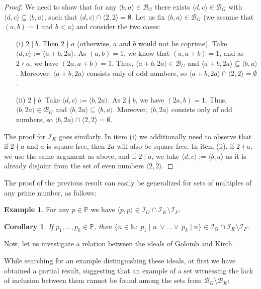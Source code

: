 \documentclass{amsart}
\newtheorem{cor}[thm]{Corollary}
\theoremstyle{definition}
\newtheorem{ex}[thm]{Example}
\newcommand{\N}{{\mathbb N}}
\newcommand{\I}{\mathcal I}
\newcommand{\B}{\mathcal{B}}
\newcommand{\arithseq}[2]{\langle#2, #1\rangle}
\begin{document}
\begin{proof}
We need to show that for any $\arithseq{a}{b} \in \B_G$ there exists $\arithseq{c}{d} \in \B_G$ with $\arithseq{c}{d} \subseteq \arithseq{a}{b}$, such that $\arithseq{c}{d} \cap \arithseq{2}{2} = \emptyset$. Let us fix $\arithseq{a}{b} \in \B_G$ (we assume that $(a,b)=1$ and $b<a$) and consider the two cases:
\begin{itemize}
 \item[(i)] $2\mid b$. Then $2 \nmid a$ (otherwise, $a$ and $b$ would not be coprime). Take $\arithseq{c}{d} := \arithseq{2a}{a+b}$. As $(a,b)=1$, we know that $(a,a+b)=1$, and as $2 \nmid a$, we have $(2a,a+b)=1$. Thus, $\arithseq{2a}{a+b}\in\B_G$ and $\arithseq{2a}{a+b}\subseteq\arithseq{a}{b}$. Moreover, $\arithseq{2a}{a+b}$ consists only of odd numbers, so $\arithseq{2a}{a+b}\cap \arithseq{2}{2} = \emptyset$.
 \item[(ii)] $2\nmid b$. Take $\arithseq{c}{d} := \arithseq{2a}{b}$. As $2\nmid b$, we have $(2a,b)=1$. Thus, $\arithseq{2a}{b}\in\B_G$ and $\arithseq{2a}{b}\subseteq\arithseq{a}{b}$. Moreover, $\arithseq{2a}{b}$ consists only of odd numbers, so $\arithseq{2a}{b}\cap \arithseq{2}{2} = \emptyset$.
\end{itemize}

The proof for $\I_K$ goes similarly. In item (i) we additionally need to observe that if $2 \nmid a$ and $a$ is square-free, then $2a$ will also be square-free. In item (ii), if $2 \nmid a$, we use the same argument as above, and if $2\mid a$, we take $\arithseq{c}{d} := \arithseq{a}{b}$ as it is already disjoint from the set of even numbers $\arithseq{2}{2}$.
\end{proof}

The proof of the previous result can easily be generalized for sets of multiples of any prime number, as follows:

\begin{ex} 
For any $p\in\mathbb{P}$ we have $\arithseq{p}{p}\in \I_G \cap \I_K \setminus \I_F$.
\end{ex}

\begin{cor}
If $p_1, \ldots, p_k \in \mathbb{P}$, then $\{n\in\N :\ p_1\mid n\ \vee \ldots \vee\ p_k\mid n\}\in \I_G \cap \I_K \setminus \I_F$.
\end{cor}

Now, let us investigate a relation between the ideals of Golomb and Kirch.

While searching for an example distinguishing these ideals, at first we have obtained a partial result, suggesting that an example of a set witnessing the lack of inclusion between them cannot be found among the sets from $\B_G \setminus \B_K$:
\end{document}
